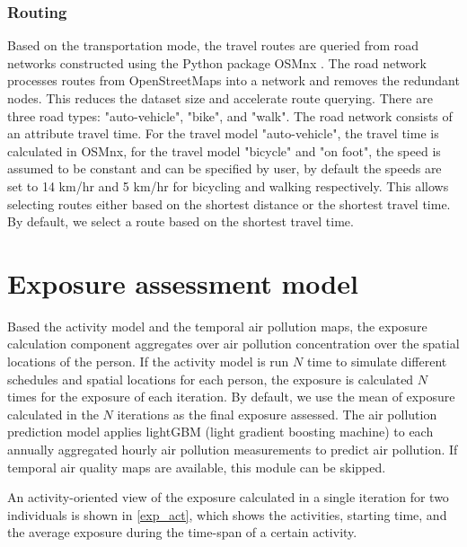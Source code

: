 \documentclass[]{article}
\begin{document}
\subsubsection{Routing} 
Based on the transportation mode, the travel routes are queried from road networks constructed using the Python package OSMnx \cite{boeing2017osmnx}. The road network processes routes from OpenStreetMaps \citep{osmdata} into a network and removes the redundant nodes. This reduces the dataset size and accelerate route querying. There are three road types: "auto-vehicle", "bike", and "walk". The road network consists of an attribute travel time. For the travel model "auto-vehicle", the travel time is calculated in OSMnx, for the travel model "bicycle" and "on foot", the speed is assumed to be constant and can be specified by user, by default the speeds are set to 14 km/hr and 5 km/hr for bicycling and walking respectively. This allows selecting routes either based on the shortest distance or the shortest travel time. By default, we select a route based on the shortest travel time.  

\section{Exposure assessment model}
\label{sec:exp}
 
 Based the activity model and the temporal air pollution maps, the exposure calculation component aggregates over air pollution concentration over the spatial locations of the person. If the activity model is run $N$ time to simulate different schedules and spatial locations for each person, the  exposure is calculated $N$ times for the exposure of each iteration. By default, we use the mean of exposure calculated in the $N$ iterations as the final exposure assessed. The air pollution prediction model applies lightGBM (light gradient boosting machine) \citep{ke2017lightgbm} to each annually aggregated hourly air pollution measurements to predict air pollution. If temporal air quality maps are available, this module can be skipped. 
     
An activity-oriented view of the exposure calculated in a single iteration for two individuals is shown in \cref{exp_act}, which shows the activities, starting time, and the average exposure during the time-span of a certain activity.
\end{document}
